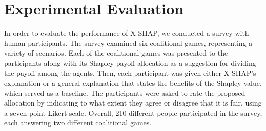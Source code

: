 \documentclass[letterpaper]{article} %
\begin{document}
\section{Experimental Evaluation}
In order to evaluate the performance of X-SHAP, we conducted a survey with human participants. The survey examined six coalitional games, representing a variety of scenarios. Each of the coalitional games was presented to the participants along with its Shapley payoff allocation as a suggestion for dividing the payoff among the agents. Then, each participant was given either  X-SHAP's explanation or a general explanation that states the benefits of the Shapley value, which served as a baseline. The participants were asked to rate the proposed allocation by indicating to what extent they agree or disagree that it is fair, using a seven-point Likert scale. Overall, 210 different people participated in the survey, each answering two different coalitional games. %

\end{document}
